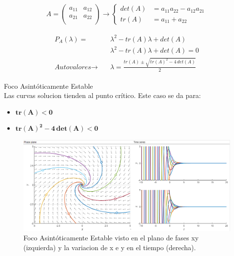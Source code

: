\documentclass[12pt,a4paper]{report} %
\begin{document}
	\begin{equation}
		A=\begin{pmatrix}
			a_{11} & a_{12}\\
			a_{21} & a_{22}\\
		\end{pmatrix}\rightarrow\left\{
		\begin{aligned}
		det(A )&= a_{11}a_{22}-a_{12}a_{21} \\
		tr(A) &= a_{11}+a_{22}
	    \end{aligned}
		\right.
	\end{equation}\smallskip
	
	\begin{eqnarray}
		\begin{aligned}
		P_A(\lambda)=&\lambda^2-tr(A)\lambda+det(A) \nonumber \\[1mm]
		&\lambda^2-tr(A)\lambda+det(A)=0 \nonumber \\[1mm]
		\textit{Autovalores}\rightarrow \quad &\lambda=\frac{tr(A)\pm \sqrt{tr(A)^2-4\,det(A)}}{2}
	    \end{aligned}
	\end{eqnarray}
	
	\newpage

	{\Large\textbullet\quad Foco Asintóticamente Estable}\\[0.5cm]
	
	Las curvas solucion tienden al punto crítico. Este caso se da para: 
	\begin{itemize}
		\item $\bm{tr(A)<0}$
		\item $\bm{tr(A)^2-4\,det(A)<0}$
	\end{itemize}
	
	\begin{figure}[h]
		\centering
		\includegraphics[width=1\textwidth]{estable.png}
		\caption{Foco Asintóticamente Estable visto en el plano de fases xy (izquierda) y la variacion de x e y en el tiempo (derecha).}
		\label{fig:estable}
	\end{figure}\smallskip
	
\end{document}

